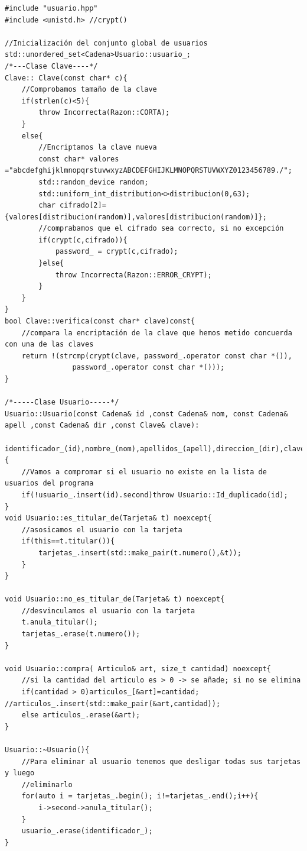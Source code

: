 \begin{verbatim}
#include "usuario.hpp"
#include <unistd.h> //crypt()

//Inicialización del conjunto global de usuarios
std::unordered_set<Cadena>Usuario::usuario_;
/*---Clase Clave----*/
Clave:: Clave(const char* c){
    //Comprobamos tamaño de la clave
    if(strlen(c)<5){
        throw Incorrecta(Razon::CORTA);
    }
    else{
        //Encriptamos la clave nueva
        const char* valores ="abcdefghijklmnopqrstuvwxyzABCDEFGHIJKLMNOPQRSTUVWXYZ0123456789./";
        std::random_device random;
        std::uniform_int_distribution<>distribucion(0,63);
        char cifrado[2]={valores[distribucion(random)],valores[distribucion(random)]};
        //comprabamos que el cifrado sea correcto, si no excepción
        if(crypt(c,cifrado)){
            password_ = crypt(c,cifrado);
        }else{
            throw Incorrecta(Razon::ERROR_CRYPT);
        }
    }
}
bool Clave::verifica(const char* clave)const{
    //compara la encriptación de la clave que hemos metido concuerda con una de las claves
    return !(strcmp(crypt(clave, password_.operator const char *()),
                password_.operator const char *()));
}

/*-----Clase Usuario-----*/
Usuario::Usuario(const Cadena& id ,const Cadena& nom, const Cadena& apell ,const Cadena& dir ,const Clave& clave):
    identificador_(id),nombre_(nom),apellidos_(apell),direccion_(dir),clave_(clave){
    //Vamos a compromar si el usuario no existe en la lista de usuarios del programa
    if(!usuario_.insert(id).second)throw Usuario::Id_duplicado(id);
}
void Usuario::es_titular_de(Tarjeta& t) noexcept{
    //asosicamos el usuario con la tarjeta
    if(this==t.titular()){
        tarjetas_.insert(std::make_pair(t.numero(),&t));
    }
}

void Usuario::no_es_titular_de(Tarjeta& t) noexcept{
    //desvinculamos el usuario con la tarjeta
    t.anula_titular();
    tarjetas_.erase(t.numero());
}

void Usuario::compra( Articulo& art, size_t cantidad) noexcept{
    //si la cantidad del articulo es > 0 -> se añade; si no se elimina
    if(cantidad > 0)articulos_[&art]=cantidad; //articulos_.insert(std::make_pair(&art,cantidad));
    else articulos_.erase(&art);
}

Usuario::~Usuario(){
    //Para eliminar al usuario tenemos que desligar todas sus tarjetas y luego
    //eliminarlo
    for(auto i = tarjetas_.begin(); i!=tarjetas_.end();i++){
        i->second->anula_titular();
    }
    usuario_.erase(identificador_);
}
    

\end{verbatim}
